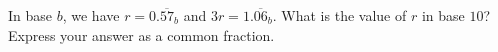 In base $b$, we have ${r=0.\overline{57}_{b}}$ and $3r=1.\overline{06}_{b}$. What is the value of $r$ in base $10$? Express your answer as a common fraction. 
